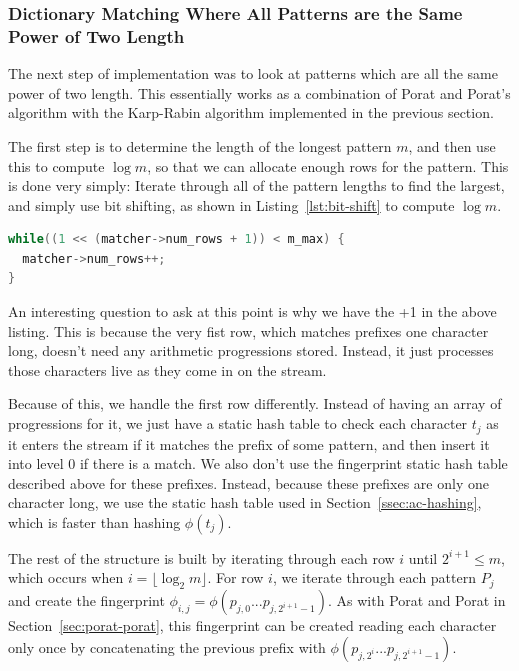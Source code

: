 \documentclass[ %
                    author={Dominic Joseph Moylett},
                    degree={MEng},
                     title={Dictionary Matching with Fingerprints},
                  subtitle={An Empirical Analysis},
                      type={Research},
                      year={2014} ]{dissertation}
\begin{document}
\subsubsection{Dictionary Matching Where All Patterns are the Same Power of Two Length}

The next step of implementation was to look at patterns which are all the same power of two length. This essentially works as a combination of Porat and Porat's algorithm with the Karp-Rabin algorithm implemented in the previous section.

The first step is to determine the length of the longest pattern $m$, and then use this to compute $\log m$, so that we can allocate enough rows for the pattern. This is done very simply: Iterate through all of the pattern lengths to find the largest, and simply use bit shifting, as shown in Listing~\ref{lst:bit-shift} to compute $\log m$.

\begin{lstlisting}[float={t},caption={Computing $\log m$ via bit shifting.},label={lst:bit-shift},language=C]
while((1 << (matcher->num_rows + 1)) < m_max) {
  matcher->num_rows++;
}
\end{lstlisting}

An interesting question to ask at this point is why we have the +1 in the above listing. This is because the very fist row, which matches prefixes one character long, doesn't need any arithmetic progressions stored. Instead, it just processes those characters live as they come in on the stream.

Because of this, we handle the first row differently. Instead of having an array of progressions for it, we just have a static hash table to check each character $t_j$ as it enters the stream if it matches the prefix of some pattern, and then insert it into level 0 if there is a match. We also don't use the fingerprint static hash table described above for these prefixes. Instead, because these prefixes are only one character long, we use the static hash table used in Section~\ref{ssec:ac-hashing}, which is faster than hashing $\phi(t_j)$.

The rest of the structure is built by iterating through each row $i$ until $2^{i+1} \leq m$, which occurs when $i = \lfloor\log_2m\rfloor$. For row $i$, we iterate through each pattern $P_j$ and create the fingerprint $\phi_{i,j} = \phi(p_{j,0}...p_{j,2^{i + 1} - 1})$. As with Porat and Porat in Section~\ref{sec:porat-porat}, this fingerprint can be created reading each character only once by concatenating the previous prefix with $\phi(p_{j,2^{i}}...p_{j,2^{i + 1} - 1})$.
\end{document}
